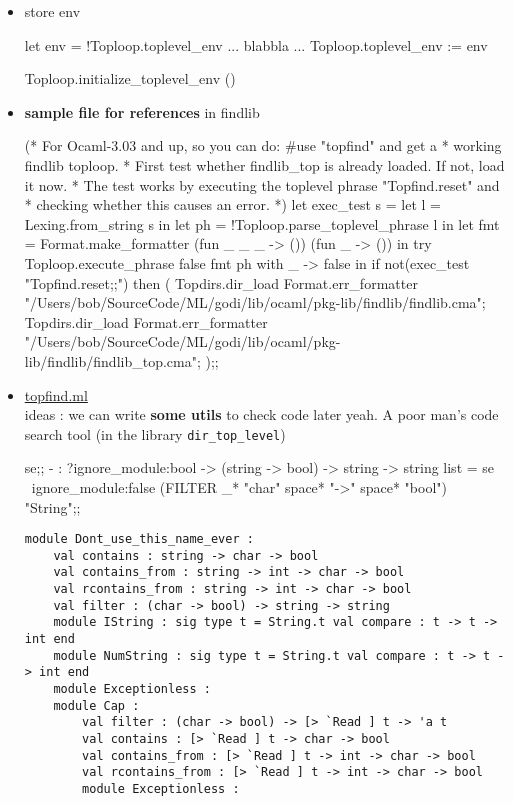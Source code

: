 \begin{enumerate}
\begin{itemize}
\item store env

  \begin{ocamlcode}
let env = !Toploop.toplevel_env
... blabbla ...     
Toploop.toplevel_env := env     
\end{ocamlcode}
\begin{ocamlcode}
Toploop.initialize_toplevel_env ()  
\end{ocamlcode}
  \item \textbf{sample file  for references } in findlib


\begin{ocamlcode}
(* For Ocaml-3.03 and up, so you can do: #use "topfind" and get a
 * working findlib toploop.
 * First test whether findlib_top is already loaded. If not, load it now.
 * The test works by executing the toplevel phrase "Topfind.reset" and
 * checking whether this causes an error.
 *)
let exec_test s =
  let l = Lexing.from_string s in
  let ph = !Toploop.parse_toplevel_phrase l in
  let fmt = Format.make_formatter (fun _ _ _ -> ()) (fun _ -> ()) in
  try
    Toploop.execute_phrase false fmt ph
  with
      _ -> false
in
if not(exec_test "Topfind.reset;;") then (
  Topdirs.dir_load Format.err_formatter "/Users/bob/SourceCode/ML/godi/lib/ocaml/pkg-lib/findlib/findlib.cma";
  Topdirs.dir_load Format.err_formatter "/Users/bob/SourceCode/ML/godi/lib/ocaml/pkg-lib/findlib/findlib_top.cma";
);;
\end{ocamlcode}

    
  \item \href{file:/Users/bob/SourceCode/ML/godi/build/distfiles/findlib-1.2.7/src/findlib/topfind.ml}{topfind.ml} \\
    ideas : we can write \textbf{some utils} to check code later 
    yeah. A poor man's code search tool (in the library \verb|dir_top_level|)


\begin{alternate}
se;;
- : ?ignore_module:bool -> (string -> bool) -> string -> string list =
se ~ignore_module:false (FILTER _*  "char" space* "->" space* "bool") "String";;
\end{alternate}

\begin{lstlisting}
module Dont_use_this_name_ever :
    val contains : string -> char -> bool
    val contains_from : string -> int -> char -> bool
    val rcontains_from : string -> int -> char -> bool
    val filter : (char -> bool) -> string -> string
    module IString : sig type t = String.t val compare : t -> t -> int end
    module NumString : sig type t = String.t val compare : t -> t -> int end
    module Exceptionless :
    module Cap :
        val filter : (char -> bool) -> [> `Read ] t -> 'a t
        val contains : [> `Read ] t -> char -> bool
        val contains_from : [> `Read ] t -> int -> char -> bool
        val rcontains_from : [> `Read ] t -> int -> char -> bool
        module Exceptionless :
\end{lstlisting}



\end{itemize}
\end{enumerate}
